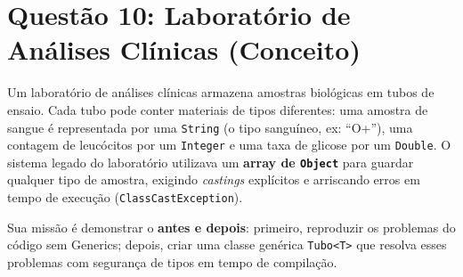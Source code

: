 \documentclass[12pt, a4paper]{article}
\begin{document}
\section*{Questão 10: Laboratório de Análises Clínicas (Conceito)}
Um laboratório de análises clínicas armazena amostras biológicas em tubos de ensaio. Cada tubo pode conter materiais de tipos diferentes: uma amostra de sangue é representada por uma \texttt{String} (o tipo sanguíneo, ex: ``O+''), uma contagem de leucócitos por um \texttt{Integer} e uma taxa de glicose por um \texttt{Double}. O sistema legado do laboratório utilizava um \textbf{array de \texttt{Object}} para guardar qualquer tipo de amostra, exigindo \textit{castings} explícitos e arriscando erros em tempo de execução (\texttt{ClassCastException}).

Sua missão é demonstrar o \textbf{antes e depois}: primeiro, reproduzir os problemas do código sem Generics; depois, criar uma classe genérica \texttt{Tubo<T>} que resolva esses problemas com segurança de tipos em tempo de compilação.
\end{document}
